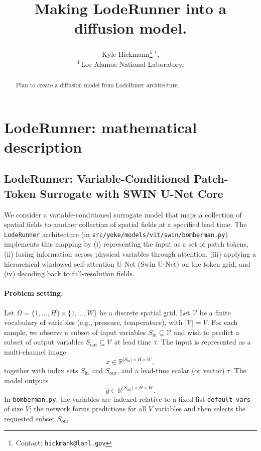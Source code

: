 \documentclass{article} %
\title{Making LodeRunner into a diffusion model.}
\author{Kyle Hickmann\thanks{Contact: \texttt{hickmank@lanl.gov}}$\;^{1}$,
   \vspace{8pt}
   \\
   \textnormal{$^{1\,}$Los Alamos National Laboratory},   
}
\begin{document}
\maketitle



\begin{abstract}
Plan to create a diffusion model from LodeRuner architecture.
\end{abstract}

\section{LodeRunner: mathematical description}


\subsection{LodeRunner: Variable-Conditioned Patch-Token Surrogate with SWIN U-Net Core}
\label{subsec:loderunner_math}

We consider a variable-conditioned surrogate model that maps a collection of spatial fields to another collection of spatial fields at a specified lead time. The \texttt{LodeRunner} architecture (in \texttt{src/yoke/models/vit/swin/bomberman.py}) implements this mapping by (i) representing the input as a set of patch tokens, (ii) fusing information across physical variables through attention, (iii) applying a hierarchical windowed self-attention U-Net (Swin U-Net) on the token grid, and (iv) decoding back to full-resolution fields.

\paragraph{Problem setting.}
Let $\Omega = \{1,\dots,H\}\times\{1,\dots,W\}$ be a discrete spatial grid. Let $\mathcal{V}$ be a finite vocabulary of variables (e.g., pressure, temperature), with $|\mathcal{V}| = V$. For each sample, we observe a subset of input variables $S_{\mathrm{in}}\subseteq \mathcal{V}$ and wish to predict a subset of output variables $S_{\mathrm{out}}\subseteq \mathcal{V}$ at lead time $\tau$.
The input is represented as a multi-channel image
\[
x \in \mathbb{R}^{|S_{\mathrm{in}}|\times H\times W},
\]
together with index sets $S_{\mathrm{in}}$ and $S_{\mathrm{out}}$, and a lead-time scalar (or vector) $\tau$. The model outputs
\[
\hat{y} \in \mathbb{R}^{|S_{\mathrm{out}}|\times H\times W}.
\]
In \texttt{bomberman.py}, the variables are indexed relative to a fixed list \texttt{default\_vars} of size $V$; the network forms predictions for all $V$ variables and then selects the requested subset $S_{\mathrm{out}}$.
\end{document}
